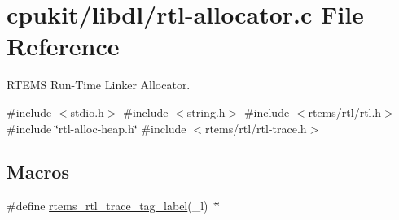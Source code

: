 \hypertarget{rtl-allocator_8c}{}\section{cpukit/libdl/rtl-\/allocator.c File Reference}
\label{rtl-allocator_8c}


R\+T\+E\+MS Run-\/\+Time Linker Allocator.  


{\ttfamily \#include $<$stdio.\+h$>$}\newline
{\ttfamily \#include $<$string.\+h$>$}\newline
{\ttfamily \#include $<$rtems/rtl/rtl.\+h$>$}\newline
{\ttfamily \#include \char`\"{}rtl-\/alloc-\/heap.\+h\char`\"{}}\newline
{\ttfamily \#include $<$rtems/rtl/rtl-\/trace.\+h$>$}\newline
\subsection*{Macros}
\begin{DoxyCompactItemize}
\item 
\#define \mbox{\hyperlink{rtl-allocator_8c_a9a79b40c47354c55f8eb12ace1ce7ab5}{rtems\+\_\+rtl\+\_\+trace\+\_\+tag\+\_\+label}}(\+\_\+l)~\char`\"{}\char`\"{}
\end{DoxyCompactItemize}

